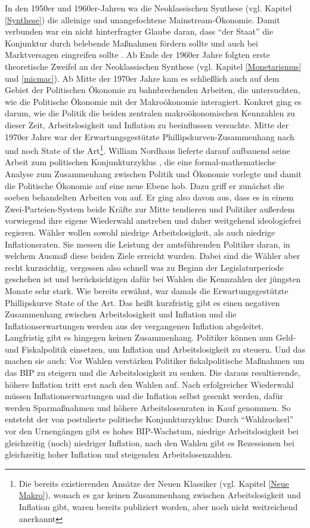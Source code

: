 In den 1950er und 1960er-Jahren wa die Neoklassischen Synthese (vgl. Kapitel \ref{Synthese}) die alleinige und unangefochtene Mainstream-Ökonomie. Damit verbunden war ein nicht hinterfragter Glaube daran, dass "`der Staat"' die Konjunktur durch belebende Maßnahmen fördern sollte und auch bei Marktversagen eingreifen sollte \parencite[S. 522]{Snowdon2005}. Ab Ende der 1960er Jahre folgten erste theoretische Zweifel an der Neoklassischen Synthese (vgl. Kapitel \ref{Monetarismus} und \ref{micmac}). Ab Mitte der 1970er Jahre kam es schließlich auch auf dem Gebiet der Politischen Ökonomie zu bahnbrechenden Arbeiten, die untersuchten, wie die Politische Ökonomie mit der Makroökonomie interagiert. Konkret ging es darum, wie die Politik die beiden zentralen makroökonomischen Kennzahlen zu dieser Zeit, Arbeitslosigkeit und Inflation zu beeinflussen versuchte. Mitte der 1970er Jahre war der Erwartungsgestützte Phillipskurven-Zusammenhang nach \textcite{Phelps1968} und \textcite{Friedman1968} noch State of the Art\footnote{Die bereits existierenden Ansätze der Neuen Klassiker (vgl. Kapitel \ref{Neue Makro}), wonach es gar keinen Zusammenhang zwischen Arbeitslosigkeit und Inflation gibt, waren bereits publiziert worden, aber noch nicht weitreichend anerkannt}. William Nordhaus lieferte darauf aufbauend seine Arbeit zum politischen Konjunkturzyklus \parencite{Nordhaus1975}, die eine formal-mathematische Analyse zum Zusammenhang zwischen Politik und Ökonomie vorlegte und damit die Politische Ökonomie auf eine neue Ebene hob. Dazu griff er zunächst die soeben behandelten Arbeiten von \textcite{Downs1957, Downs1957b} auf. Er ging also davon aus, dass es in einem Zwei-Parteien-System beide Kräfte zur Mitte tendieren und Politiker außerdem vorwiegend ihre eigene Wiederwahl anstreben und daher weitgehend ideologiefrei regieren. Wähler wollen sowohl niedrige Arbeitslosigkeit, als auch niedrige Inflationsraten. Sie messen die Leistung der amtsführenden Politiker daran, in welchem Ausmaß diese beiden Ziele erreicht wurden. Dabei sind die Wähler aber recht kurzsichtig, vergessen also schnell was zu Beginn der Legislaturperiode geschehen ist und berücksichtigen dafür bei Wahlen die Kennzahlen der jüngsten Monate sehr stark. Wie bereits erwähnt, war damals die Erwartungsgestützte Phillipskurve State of the Art. Das heißt kurzfristig gibt es einen negativen Zusammenhang zwischen Arbeitslosigkeit und Inflation und die Inflationserwartungen werden aus der vergangenen Inflation abgeleitet. Langfristig gibt es hingegen keinen Zusammenhang. Politiker können nun Geld- und Fiskalpolitik einsetzen, um Inflation und Arbeitslosigkeit zu steuern. Und das machen sie auch: Vor Wahlen verstärken Politiker fiskalpolitische Maßnahmen um das BIP zu steigern und die Arbeitslosigkeit zu senken. Die daraus resultierende, höhere Inflation tritt erst nach den Wahlen auf. Nach erfolgreicher Wiederwahl müssen Inflationserwartungen und die Inflation selbst gesenkt werden, dafür werden Sparmaßnahmen und höhere Arbeitslosenraten in Kauf genommen. So entsteht der von \textcite{Nordhaus1975} postulierte politische Konjunkturzyklus: Durch "`Wahlzuckerl"' vor den Urnengängen gibt es hohes BIP-Wachstum, niedrige Arbeitslosigkeit bei gleichzeitig (noch) niedriger Inflation, nach den Wahlen gibt es Rezessionen bei gleichzeitig hoher Inflation und steigenden Arbeitslosenzahlen.
